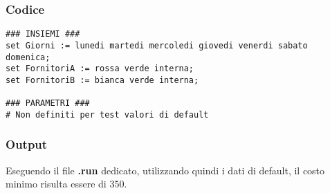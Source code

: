 \subsubsection{Codice}
\begin{lstlisting}
### INSIEMI ###
set Giorni := lunedi martedi mercoledi giovedi venerdi sabato domenica;
set FornitoriA := rossa verde interna;
set FornitoriB := bianca verde interna;

### PARAMETRI ###
# Non definiti per test valori di default
\end{lstlisting}
\subsubsection{Output}
Eseguendo il file \textbf{.run} dedicato, utilizzando quindi i dati di default, il costo minimo risulta essere di \texteuro $350$.